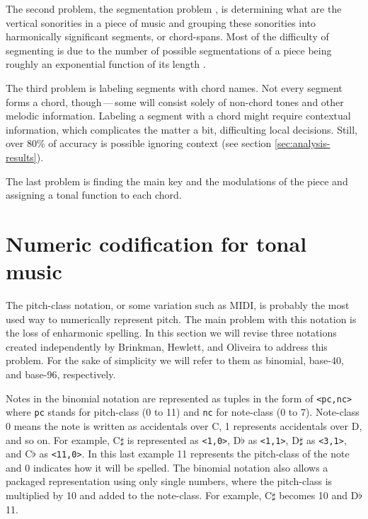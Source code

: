 \documentclass{article}
\begin{document}
The second problem, the segmentation problem
\cite{pardo.ea:automated}, is determining what are the vertical
sonorities in a piece of music and grouping these sonorities into
harmonically significant segments, or chord-spans. Most of the
difficulty of segmenting is due to the number of possible
segmentations of a piece being roughly an exponential function of its
length \cite{pardo.ea:algorithms}.

The third problem is labeling segments with chord names. Not every
segment forms a chord, though\,---\,some will consist solely of non-chord
tones and other melodic information. Labeling a segment with a chord might
require contextual information, which complicates the matter a bit,
difficulting local decisions. Still, over 80\% of accuracy is possible
ignoring context (see section \ref{sec:analysis-results}).

The last problem is finding the main key and the modulations of the
piece and assigning a tonal function to each chord.

\section{Numeric codification for tonal music}
\label{sec:codificacao-jamary}

The pitch-class notation, or some variation such as MIDI, is probably
the most used way to numerically represent pitch. The main problem
with this notation is the loss of enharmonic spelling. In this section
we will revise three notations created independently by Brinkman,
Hewlett, and Oliveira \cite{brinkman:binomial, hewlett:base-40,
  oliveira:busca} to address this problem. For the sake of simplicity
we will refer to them as binomial, base-40, and base-96, respectively.

Notes in the binomial notation are represented as tuples in the form
of \texttt{<pc,nc>} where \texttt{pc} stands for pitch-class (0 to 11)
and \texttt{nc} for note-class (0 to 7). Note-class 0 means the note
is written as accidentals over C, 1 represents accidentals over D, and
so on. For example, C$\sharp$ is represented as \texttt{<1,0>},
D$\flat$ as \texttt{<1,1>}, D$\sharp$ as \texttt{<3,1>}, and C$\flat$
as \texttt{<11,0>}. In this last example 11 represents the pitch-class
of the note and 0 indicates how it will be spelled. The binomial
notation also allows a packaged representation using only single
numbers, where the pitch-class is multiplied by 10 and added to the
note-class. For example, C$\sharp$ becomes 10 and D$\flat$
11.
\end{document}
